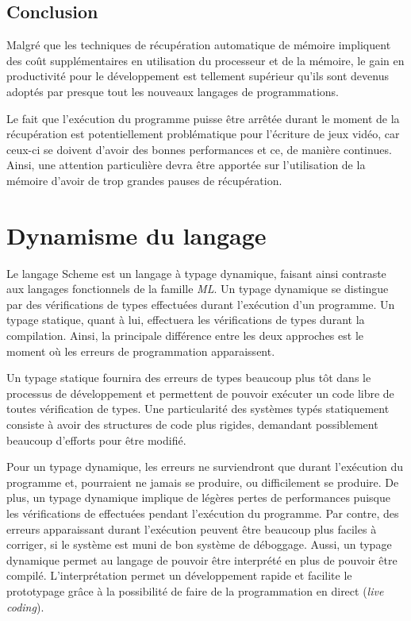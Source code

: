 \documentclass[12pt,oneside,letterpaper,francais]{book}
\begin{document}
\subsection{Conclusion}

Malgré que les techniques de récupération automatique de mémoire
impliquent des coût supplémentaires en utilisation du processeur et de
la mémoire, le gain en productivité pour le développement est
tellement supérieur qu'ils sont devenus adoptés par presque tout les
nouveaux langages de programmations. 

Le fait que l'exécution du programme puisse être arrêtée durant le
moment de la récupération est potentiellement problématique pour
l'écriture de jeux vidéo, car ceux-ci se doivent d'avoir des bonnes
performances et ce, de manière continues. Ainsi, une attention
particulière devra être apportée sur l'utilisation de la mémoire
d'avoir de trop grandes pauses de récupération.



\section{Dynamisme du langage}

Le langage Scheme est un langage à typage dynamique, faisant ainsi
contraste aux langages fonctionnels de la famille \textit{ML}. Un
typage dynamique se distingue par des vérifications de types
effectuées durant l'exécution d'un programme. Un typage statique,
quant à lui, effectuera les vérifications de types durant la
compilation. Ainsi, la principale différence entre les deux approches
est le moment où les erreurs de programmation apparaissent. 

Un typage statique fournira des erreurs de types beaucoup plus tôt
dans le processus de développement et permettent de pouvoir exécuter
un code libre de toutes vérification de types. Une particularité des
systèmes typés statiquement consiste à avoir des structures de code
plus rigides, demandant possiblement beaucoup d'efforts pour être
modifié. 

Pour un typage dynamique, les erreurs ne surviendront que durant
l'exécution du programme et, pourraient ne jamais se produire, ou
difficilement se produire. De plus, un typage dynamique implique de
légères pertes de performances puisque les vérifications de effectuées
pendant l'exécution du programme. Par contre, des erreurs apparaissant
durant l'exécution peuvent être beaucoup plus faciles à corriger, si
le système est muni de bon système de déboggage. Aussi, un typage
dynamique permet au langage de pouvoir être interprété en plus de
pouvoir être compilé. L'interprétation permet un développement rapide
et facilite le prototypage grâce à la possibilité de faire de la
programmation en direct (\textit{live coding}). 
\end{document}

